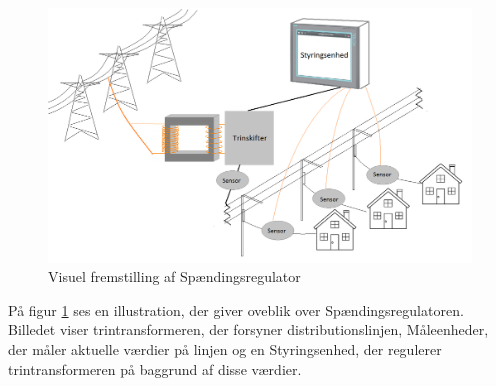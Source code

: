 \begin{figure}[H]
	\centering
	\includegraphics[width=1\textwidth]{figure/RigtBillede}
	\caption{Visuel fremstilling af Spændingsregulator}
	\label{fig:Rigtbillede}
\end{figure}

På figur \ref{fig:Rigtbillede} ses en illustration, der giver oveblik over Spændingsregulatoren. Billedet viser trintransformeren, der forsyner distributionslinjen, Måleenheder, der måler aktuelle værdier på linjen og en Styringsenhed, der regulerer trintransformeren på baggrund af disse værdier. 